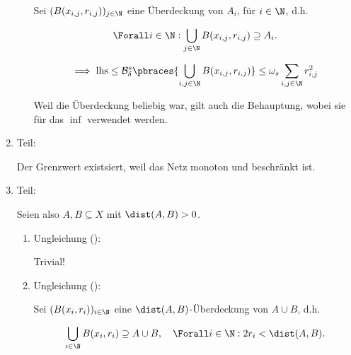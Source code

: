 \begin{solution}
\begin{enumerate}[label = \arabic*.]
\begin{enumerate}[label = \arabic*.]
        Sei $(B(x_{i, j}, r_{i, j}))_{j \in \N}$ eine Überdeckung von $A_i$, für $i \in \N$, d.h.

        \begin{align*}
            \Forall i \in \N:
                \bigcup_{j \in \N}
                    B(x_{i, j}, r_{i, j})
                \supseteq
                A_i.
        \end{align*}

        \begin{align*}
            \implies
            \mathrm{lhs}
            \leq
            \mathcal{B}_\delta^s
            \pbraces
            {
                \bigcup_{i, j \in \N}
                    B(x_{i, j}, r_{i, j})
            }
            \leq
            \omega_s
            \sum_{i, j \in \N}
                r_{i, j}^2
        \end{align*}

        Weil die Überdeckung beliebig war, gilt auch die Behauptung, wobei sie für das $\inf$ verwendet werden.

    \end{enumerate}

    \item Teil:
    
    Der Grenzwert existsiert, weil das Netz monoton und beschränkt ist.

    \item Teil:
    

    Seien also $A, B \subseteq X$ mit $\dist(A, B) > 0$.

    \begin{enumerate}

        \item Ungleichung (\Quote{$\leq$}):
        
        Trivial!

        \item Ungleichung (\Quote{$\geq$}):

        Sei $(B(x_i, r_i))_{i \in \N}$ eine $\dist(A, B)$-Überdeckung von $A \cup B$, d.h.

        \begin{align*}
            \bigcup_{i \in \N}
                B(x_i, r_i)
            \supseteq
            A \cup B,
            \quad
            \Forall i \in \N:
                2 r_i < \dist(A, B).
        \end{align*}


\end{enumerate}
\end{enumerate}
\end{solution}
